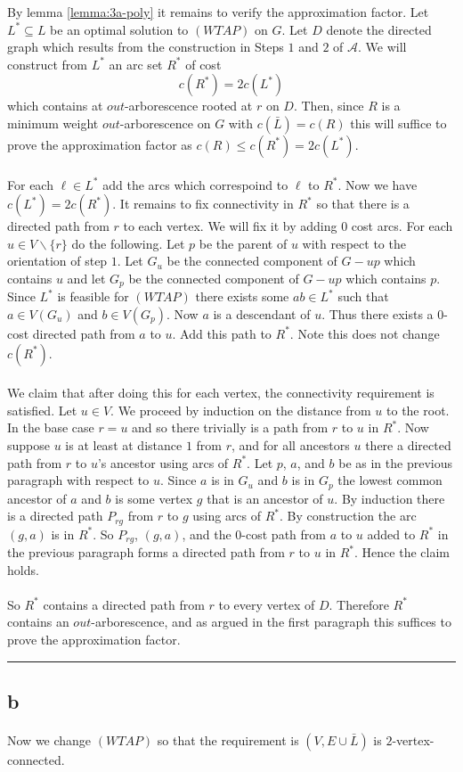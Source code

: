 \documentclass[letterpaper,12pt,oneside,onecolumn]{article}
\newcommand{\cA}{\mathcal{A}} \newcommand{\cB}{\mathcal{B}}
\newenvironment{proof}{{\bf Proof:  }}{\hfill\rule{2mm}{2mm}}
\begin{document}
\begin{proof}
By lemma \ref{lemma:3a-poly} it remains to verify the approximation factor. Let $L^* \subseteq L$ be an optimal solution to $(WTAP)$ on $G$. Let $D$ denote the directed graph which results from the construction in Steps $1$ and $2$ of $\cA$. We will construct from $L^*$ an arc set $R^*$ of cost
$$c(R^*)=2c(L^*)$$
which contains at $out$-arborescence rooted at $r$ on $D$.
Then, since $R$ is a minimum weight $out$-arborescence on $G$ with $c(\bar{L}) = c(R)$ this will suffice to prove the approximation factor as $c(R) \leq c(R^*) = 2c(L^*)$.
\paragraph{}
For each $\ell \in L^*$ add the arcs which correspoind to $\ell$ to $R^*$. Now we have $c(L^*) = 2c(R^*)$. It remains to fix connectivity in $R^*$ so that there is a directed path from $r$ to each vertex. We will fix it by adding $0$ cost arcs. For each $u \in V\backslash \{r\}$ do the following. Let $p$ be the parent of $u$ with respect to the orientation of step $1$.  Let $G_u$ be the connected component of $G-up$ which contains $u$ and let $G_p$ be the connected component of $G-up$ which contains $p$. Since $L^*$ is feasible for $(WTAP)$ there exists some $ab \in L^*$ such that $a \in V(G_u)$ and $b \in V(G_p)$. Now $a$ is a descendant of $u$. Thus there exists a $0$-cost directed path from $a$ to $u$. Add this path to $R^*$. Note this does not change $c(R^*)$.
\paragraph{}
We claim that after doing this for each vertex, the connectivity requirement is satisfied. Let $u \in V$. We proceed by induction on the distance from $u$ to the root. In the base case $r=u$ and so there trivially is a path from $r$ to $u$ in $R^*$. Now suppose $u$ is at least at distance $1$ from $r$, and for all ancestors $u$ there a directed path from $r$ to $u$'s ancestor using arcs of $R^*$. Let $p$, $a$, and $b$ be as in the previous paragraph with respect to $u$. Since $a$ is in $G_u$ and $b$ is in $G_p$ the lowest common ancestor of $a$ and $b$ is some vertex $g$ that is an ancestor of $u$. By induction there is a directed path $P_{rg}$ from $r$ to $g$ using arcs of $R^*$. By construction the arc $(g,a)$ is in $R^*$. So $P_{rg}$, $(g,a)$, and the $0$-cost path from $a$ to $u$ added to $R^*$ in the previous paragraph forms a directed path from $r$ to $u$ in $R^*$. Hence the claim holds. 
\paragraph{}
So $R^*$ contains a directed path from $r$ to every vertex of $D$. Therefore $R^*$ contains an $out$-arborescence, and as argued in the first paragraph this suffices to prove the approximation factor.
\end{proof}
\subsection{b}
\paragraph{}
Now we change $(WTAP)$ so that the requirement is $(V, E\cup \bar{L})$ is $2$-vertex-connected.
\section{}
\end{document}
